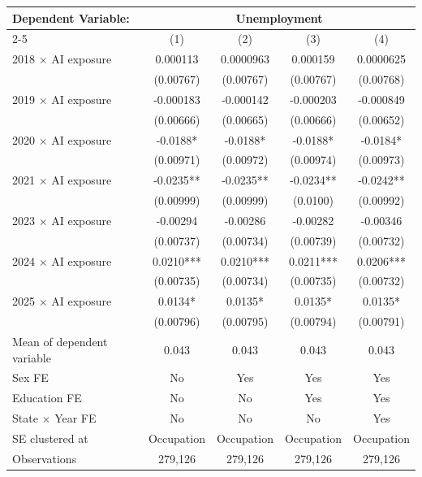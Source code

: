 \def\sym#1{\ifmmode^{#1}\else\(^{#1}\)\fi}
\begin{tabular}{l*{4}{c}}
\toprule
Dependent Variable: & \multicolumn{4}{c}{Unemployment} \\
\cmidrule(lr){2-5}
 & (1) & (2) & (3) & (4) \\
\midrule
2018 $\times$ AI exposure&    0.000113   &   0.0000963   &    0.000159   &   0.0000625   \\
            &   (0.00767)   &   (0.00767)   &   (0.00767)   &   (0.00768)   \\
2019 $\times$ AI exposure&   -0.000183   &   -0.000142   &   -0.000203   &   -0.000849   \\
            &   (0.00666)   &   (0.00665)   &   (0.00666)   &   (0.00652)   \\
2020 $\times$ AI exposure&     -0.0188*  &     -0.0188*  &     -0.0188*  &     -0.0184*  \\
            &   (0.00971)   &   (0.00972)   &   (0.00974)   &   (0.00973)   \\
2021 $\times$ AI exposure&     -0.0235** &     -0.0235** &     -0.0234** &     -0.0242** \\
            &   (0.00999)   &   (0.00999)   &    (0.0100)   &   (0.00992)   \\
2023 $\times$ AI exposure&    -0.00294   &    -0.00286   &    -0.00282   &    -0.00346   \\
            &   (0.00737)   &   (0.00734)   &   (0.00739)   &   (0.00732)   \\
2024 $\times$ AI exposure&      0.0210***&      0.0210***&      0.0211***&      0.0206***\\
            &   (0.00735)   &   (0.00734)   &   (0.00735)   &   (0.00732)   \\
2025 $\times$ AI exposure&      0.0134*  &      0.0135*  &      0.0135*  &      0.0135*  \\
            &   (0.00796)   &   (0.00795)   &   (0.00794)   &   (0.00791)   \\
\midrule
Mean of dependent variable&       0.043   &       0.043   &       0.043   &       0.043   \\
Sex FE      &          No   &         Yes   &         Yes   &         Yes   \\
Education FE&          No   &          No   &         Yes   &         Yes   \\
State $\times$ Year FE&          No   &          No   &          No   &         Yes   \\
SE clustered at&  Occupation   &  Occupation   &  Occupation   &  Occupation   \\
Observations&     279,126   &     279,126   &     279,126   &     279,126   \\
\bottomrule
\end{tabular}
